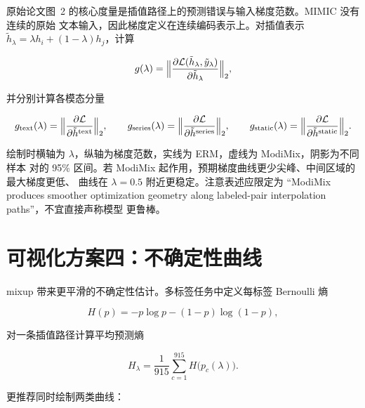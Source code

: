 \documentclass[11pt,a4paper]{article}
\theoremstyle{definition}
\begin{document}
原始论文图~2 的核心度量是插值路径上的预测错误与输入梯度范数。MIMIC 没有连续的原始
文本输入，因此梯度定义在连续编码表示上。对插值表示
$\tilde{h}_\lambda=\lambda h_i+(1-\lambda)h_j$，计算

\begin{equation}
  g(\lambda)=\Bigl\lVert
    \frac{\partial\mathcal{L}(\tilde{h}_\lambda,\tilde{y}_\lambda)}
         {\partial\tilde{h}_\lambda}
  \Bigr\rVert_2,
  \label{eq:grad-norm}
\end{equation}

并分别计算各模态分量

\begin{equation}
  g_{\text{text}}(\lambda)=\Bigl\lVert
    \frac{\partial\mathcal{L}}{\partial\tilde{h}^{\text{text}}}\Bigr\rVert_2,\qquad
  g_{\text{series}}(\lambda)=\Bigl\lVert
    \frac{\partial\mathcal{L}}{\partial\tilde{h}^{\text{series}}}\Bigr\rVert_2,\qquad
  g_{\text{static}}(\lambda)=\Bigl\lVert
    \frac{\partial\mathcal{L}}{\partial\tilde{h}^{\text{static}}}\Bigr\rVert_2.
  \label{eq:grad-per-modality}
\end{equation}

绘制时横轴为 $\lambda$，纵轴为梯度范数，实线为 ERM，虚线为 ModiMix，阴影为不同样本
对的 95\% 区间。若 ModiMix 起作用，预期梯度曲线更少尖峰、中间区域的最大梯度更低、
曲线在 $\lambda=0.5$ 附近更稳定。注意表述应限定为 “ModiMix produces smoother
optimization geometry along labeled-pair interpolation paths”，不宜直接声称模型
更鲁棒。

\section{可视化方案四：不确定性曲线}
\label{sec:vis-uncertainty}

mixup 带来更平滑的不确定性估计。多标签任务中定义每标签 Bernoulli 熵

\begin{equation}
  H(p)=-p\log p-(1-p)\log(1-p),
  \label{eq:entropy}
\end{equation}

对一条插值路径计算平均预测熵

\begin{equation}
  H_\lambda=\frac{1}{915}\sum_{c=1}^{915}H\bigl(p_c(\lambda)\bigr).
  \label{eq:mean-entropy}
\end{equation}

更推荐同时绘制两类曲线：
\end{document}
